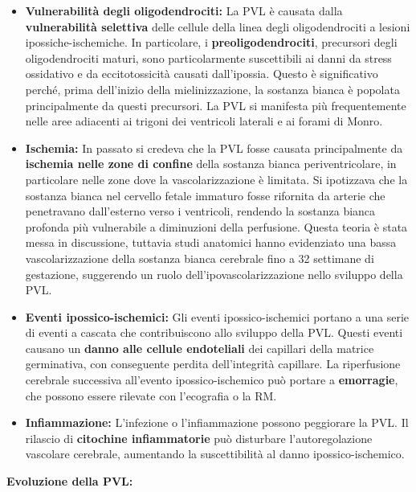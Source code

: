\begin{itemize}
	\tightlist
	\item
	\textbf{Vulnerabilità degli oligodendrociti:} La PVL è causata dalla \textbf{vulnerabilità selettiva} delle cellule della linea degli oligodendrociti a lesioni ipossiche-ischemiche. In particolare, i \textbf{preoligodendrociti}, precursori degli oligodendrociti maturi, sono particolarmente suscettibili ai danni da stress ossidativo e da eccitotossicità causati dall'ipossia. Questo è significativo perché, prima dell'inizio della mielinizzazione, la sostanza bianca è popolata principalmente da questi precursori. La PVL si manifesta più frequentemente nelle aree adiacenti ai trigoni dei ventricoli laterali e ai forami di Monro.
	\item
	\textbf{Ischemia:} In passato si credeva che la PVL fosse causata principalmente da \textbf{ischemia nelle zone di confine} della sostanza bianca periventricolare, in particolare nelle zone dove la vascolarizzazione è limitata. Si ipotizzava che la sostanza bianca nel cervello fetale immaturo fosse rifornita da arterie che penetravano dall'esterno verso i ventricoli, rendendo la sostanza bianca profonda più vulnerabile a diminuzioni della perfusione. Questa teoria è stata messa in discussione, tuttavia studi anatomici hanno evidenziato una bassa vascolarizzazione della sostanza bianca cerebrale fino a 32 settimane di gestazione, suggerendo un ruolo dell'ipovascolarizzazione nello sviluppo della PVL.
	\item
	\textbf{Eventi ipossico-ischemici:} Gli eventi ipossico-ischemici portano a una serie di eventi a cascata che contribuiscono allo sviluppo della PVL. Questi eventi causano un \textbf{danno alle cellule endoteliali} dei capillari della matrice germinativa, con conseguente perdita dell'integrità capillare. La riperfusione cerebrale successiva all'evento ipossico-ischemico può portare a \textbf{emorragie}, che possono essere rilevate con l'ecografia o la RM.
	\item
	\textbf{Infiammazione:} L'infezione o l'infiammazione possono peggiorare la PVL. Il rilascio di \textbf{citochine infiammatorie} può disturbare l'autoregolazione vascolare cerebrale, aumentando la suscettibilità al danno ipossico-ischemico.
\end{itemize}

\textbf{Evoluzione della PVL:}

